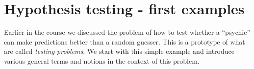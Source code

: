 \documentclass[preprint,  11pt]{amsart}
\theoremstyle{plain} %
\theoremstyle{definition} %
\newtheorem{exercise}[theorem]{Exercise}
\newtheorem{remark}[theorem]{Remark}
\begin{document}


\section{Hypothesis testing - first examples}
Earlier in the course we discussed the problem of how to test whether a ``psychic'' can make predictions better than a random guesser. This is a prototype of what are called {\em testing problems}. We start with this simple example and introduce various general terms and notions in the context of this problem.
\end{document}
